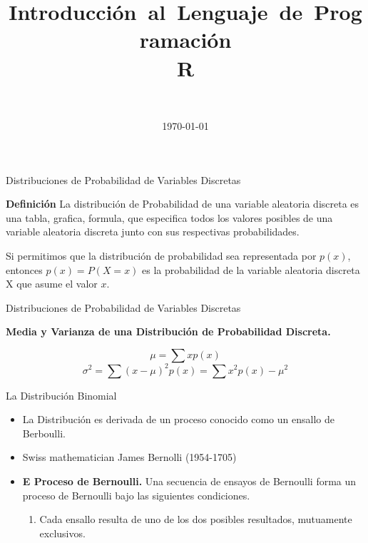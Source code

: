\documentclass{beamer}
\title[Distribuciones de Probabilidad]
{\mbox{Introducci\'on al Lenguaje de Programaci\'on}\\\mbox{R}}
\author[santosg572@gmail.com]{\nombre \\
{\small \correo}}
\institute[\iniciales]{\instituto}
\date{\today}
\theoremstyle{definition}
\theoremstyle{remark}
\begin{document}
\begin{frame}[label=titlepage]
\titlepage

\end{frame}





\begin{frame}{Distribuciones de Probabilidad de Variables Discretas}

\textbf{Definici\'on} La distribuci\'on de Probabilidad de una variable aleatoria discreta es una tabla, grafica, formula, que especifica todos los valores posibles de una variable aleatoria discreta junto con sus respectivas probabilidades.

\vspace{3mm}

Si permitimos que la distribuci\'on de probabilidad sea representada por $p(x)$, entonces $p(x) = P(X = x)$ es la probabilidad de la variable aleatoria discreta X que asume el valor $x$.


\end{frame}

\begin{frame}{Distribuciones de Probabilidad de Variables Discretas}

\textbf{Media y Varianza de una Distribuci\'on de Probabilidad Discreta.} 

\[
\mu = \sum x p(x)
\]
\[
\sigma^2 = \sum (x - \mu)^2 p(x) = \sum x^2 p(x) - \mu^2
\]


\end{frame}

\begin{frame}{La Distribuci\'on Binomial }

\begin{itemize}
\item La Distribuci\'on es derivada de un proceso conocido como un ensallo de Berboulli.
\item Swiss mathematician James Bernolli (1954-1705)
\item \textbf{E Proceso de Bernoulli.} Una secuencia de ensayos de Bernoulli forma un proceso de Bernoulli bajo las siguientes condiciones.

\begin{enumerate}
\item Cada ensallo resulta de uno de los dos posibles resultados, mutuamente exclusivos. 
\end{enumerate}

\end{itemize}

\end{frame}
\end{document}
